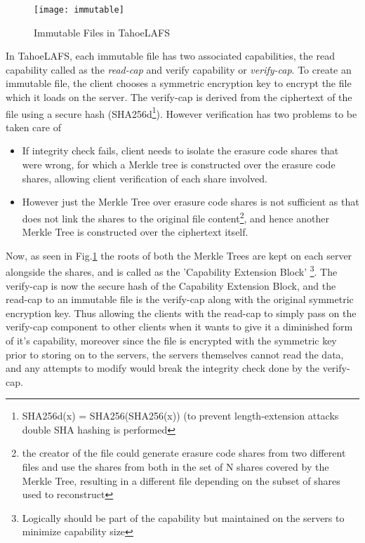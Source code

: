 \begin{figure}[h]
\centering
\texttt{[image: immutable]}
\caption{Immutable Files in TahoeLAFS}
\label{fig:immutable}
\end{figure}

In TahoeLAFS, each immutable file has two associated capabilities, the read capability called as the \textit{read-cap} and verify capability or 
\textit{verify-cap}. To create an immutable file, the client chooses a symmetric encryption key to encrypt the file which it loads on the server. The verify-cap is derived from the ciphertext of the file using a secure hash (SHA256d\footnote{SHA256d(x) = SHA256(SHA256(x)) (to prevent length-extension attacks double SHA hashing is performed}). However verification has two problems to be taken care of
\begin{itemize}
\item If integrity check fails, client needs to isolate the erasure code shares that were wrong, for which a Merkle tree is constructed over the erasure code shares, allowing client verification of each share involved.
\item However just the Merkle Tree over erasure code shares is not sufficient as that does not link the shares to the original file content\footnote{the creator of the file could generate erasure code shares from two different files and use the shares from both in the set of N shares covered by the Merkle Tree, resulting in a different file depending on the subset of shares used to reconstruct}, and hence another Merkle Tree is constructed over the ciphertext itself.
\end{itemize}
Now, as seen in Fig.\ref{fig:immutable} the roots of both the Merkle Trees are kept on each server alongside the shares, and is called as the 'Capability Extension Block' \footnote{Logically should be part of the capability but maintained on the servers to minimize capability size}. The verify-cap is now the secure hash of the Capability Extension Block, and the read-cap to an immutable file is the verify-cap along with the original symmetric encryption key. Thus allowing the clients with the read-cap to simply pass on the verify-cap component to other clients when it wants to give it a diminished form of it's capability, moreover since the file is encrypted with the symmetric key prior to storing on to the servers, the servers themselves cannot read the data, and any attempts to modify would break the integrity check done by the verify-cap.

